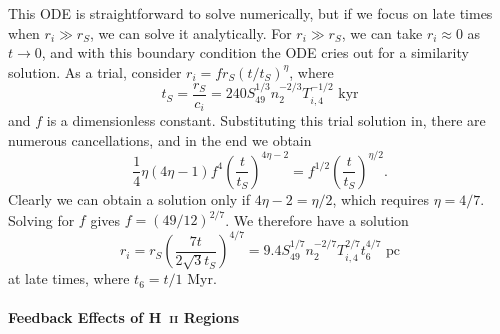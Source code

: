 This ODE is straightforward to solve numerically, but if we focus on late times when $r_i \gg r_S$, we can solve it analytically. For $r_i \gg r_S$, we can take $r_i \approx 0$ as $t\rightarrow 0$, and with this boundary condition the ODE cries out for a similarity solution. As a trial, consider $r_i = f r_S (t/t_S)^\eta$, where 
\begin{equation}
t_S = \frac{r_S}{c_i} = 240  S_{49}^{1/3} n_2^{-2/3} T_{i,4}^{-1/2}\mbox{ kyr}
\end{equation}
and $f$ is a dimensionless constant. Substituting this trial solution in, there are numerous cancellations, and in the end we obtain
\begin{equation}
\frac{1}{4} \eta (4\eta-1) f^4 \left(\frac{t}{t_S}\right)^{4\eta-2} = f^{1/2} \left(\frac{t}{t_S}\right)^{\eta/2}.
\end{equation}
Clearly we can obtain a solution only if $4\eta-2 = \eta/2$, which requires $\eta = 4/7$. Solving for $f$ gives $f=(49/12)^{2/7}$. We therefore have a solution
\begin{equation}
r_i = r_S \left(\frac{7 t}{2\sqrt{3} t_S}\right)^{4/7} = 9.4 S_{49}^{1/7} n_2^{-2/7} T_{i,4}^{2/7} t_6^{4/7}\mbox{ pc}
\end{equation}
at late times, where $t_6 = t/1$ Myr.

\paragraph{Feedback Effects of H~\textsc{ii} Regions}

